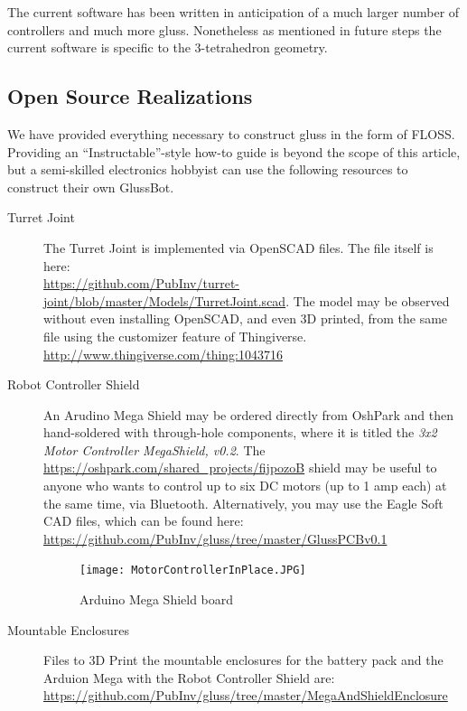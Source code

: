 \documentclass[11pt]{article}
\begin{document}
The current software has been written in anticipation of a much larger number of controllers and much more gluss.
Nonetheless as mentioned in future steps the current software is specific to the 3-tetrahedron geometry.


\subsection{Open Source Realizations}

We have provided everything necessary to construct gluss in the form of FLOSS. Providing an ``Instructable''-style
how-to guide is beyond the scope of this article, but a semi-skilled electronics hobbyist can use the
following resources to construct their own GlussBot.

\begin{description}
  
\item [Turret Joint]
  The Turret Joint is implemented via OpenSCAD files. The file itself is here:\\
  \href{https://github.com/PubInv/turret-joint/blob/master/Models/TurretJoint.scad}
       {https://github.com/PubInv/turret-joint/blob/master/Models/TurretJoint.scad}.
       The model may be observed without even installing OpenSCAD, and even 3D printed,
       from the same file using the customizer feature of Thingiverse.\\
       \href{http://www.thingiverse.com/thing:1043716}{http://www.thingiverse.com/thing:1043716}
  
\item [Robot Controller Shield]
  An Arudino Mega Shield may be ordered directly from OshPark and then hand-soldered with through-hole components,
  where it is titled the \emph{3x2 Motor Controller MegaShield, v0.2}.
  The \href{https://oshpark.com/shared_projects/fijpozoB}{https://oshpark.com/shared\_projects/fijpozoB} shield
  may be useful to anyone who wants to control up to six DC motors (up to 1 amp each) at the same time, via Bluetooth.
  Alternatively, you may use the Eagle Soft CAD files, which can be found here:
  \href{https://github.com/PubInv/gluss/tree/master/GlussPCBv0.1}
  {https://github.com/PubInv/gluss/tree/master/GlussPCBv0.1}
  \begin{figure}[!ht]
    \centering
    \texttt{[image: MotorControllerInPlace.JPG]}
    \caption{Arduino Mega Shield board}
  \end{figure}

\item [Mountable Enclosures]
  Files to 3D Print the mountable enclosures for the battery pack and the Arduion Mega with the Robot Controller Shield are:\\
  \href{https://github.com/PubInv/gluss/tree/master/MegaAndShieldEnclosure}{https://github.com/PubInv/gluss/tree/master/MegaAndShieldEnclosure}


\end{description}
\end{document}
